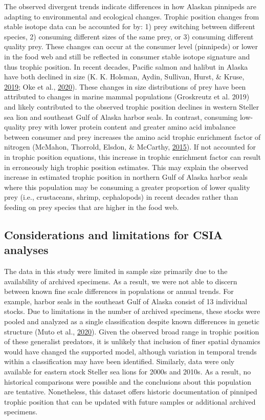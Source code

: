 \documentclass [11pt, proquest] {uwthesis}[2015/03/03]
\begin{document}
The observed divergent trends indicate differences in how Alaskan
pinnipeds are adapting to environmental and ecological changes. Trophic
position changes from stable isotope data can be accounted for by: 1)
prey switching between different species, 2) consuming different sizes
of the same prey, or 3) consuming different quality prey. These changes
can occur at the consumer level (pinnipeds) or lower in the food web and
still be reflected in consumer stable isotope signature and thus trophic
position. In recent decades, Pacific salmon and halibut in Alaska have
both declined in size (K. K. Holsman, Aydin, Sullivan, Hurst, \& Kruse,
\protect\hyperlink{ref-Holsman2019}{2019}; Oke et al.,
\protect\hyperlink{ref-Oke2020}{2020}). These changes in size
distributions of prey have been attributed to changes in marine mammal
populations (Groskreutz et al. 2019) and likely contributed to the
observed trophic position declines in western Steller sea lion and
southeast Gulf of Alaska harbor seals. In contrast, consuming
low-quality prey with lower protein content and greater amino acid
imbalance between consumer and prey increases the amino acid trophic
enrichment factor of nitrogen (McMahon, Thorrold, Elsdon, \& McCarthy,
\protect\hyperlink{ref-McMahon2015}{2015}). If not accounted for in
trophic position equations, this increase in trophic enrichment factor
can result in erroneously high trophic position estimates. This may
explain the observed increase in estimated trophic position in northern
Gulf of Alaska harbor seals where this population may be consuming a
greater proportion of lower quality prey (i.e., crustaceans, shrimp,
cephalopods) in recent decades rather than feeding on prey species that
are higher in the food web.

\subsection{Considerations and limitations for CSIA
analyses}\label{considerations-and-limitations-for-csia-analyses}

The data in this study were limited in sample size primarily due to the
availability of archived specimens. As a result, we were not able to
discern between known fine scale differences in populations or annual
trends. For example, harbor seals in the southeast Gulf of Alaska
consist of 13 individual stocks. Due to limitations in the number of
archived specimens, these stocks were pooled and analyzed as a single
classification despite known differences in genetic structure (Muto et
al., \protect\hyperlink{ref-Muto2020}{2020}). Given the observed broad
range in trophic position of these generalist predators, it is unlikely
that inclusion of finer spatial dynamics would have changed the
supported model, although variation in temporal trends within a
classification may have been identified. Similarly, data were only
available for eastern stock Steller sea lions for 2000s and 2010s. As a
result, no historical comparisons were possible and the conclusions
about this population are tentative. Nonetheless, this dataset offers
historic documentation of pinniped trophic position that can be updated
with future samples or additional archived specimens.
\end{document}

